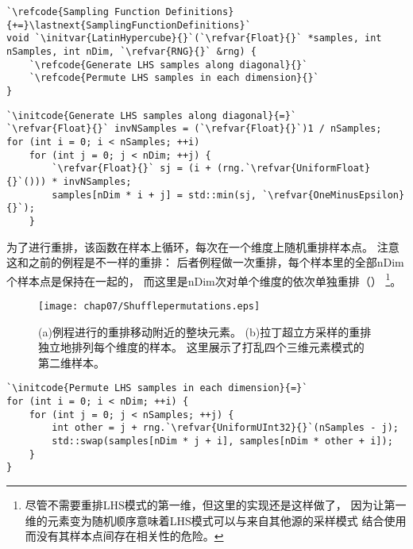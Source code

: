 \begin{lstlisting}
`\refcode{Sampling Function Definitions}{+=}\lastnext{SamplingFunctionDefinitions}`
void `\initvar{LatinHypercube}{}`(`\refvar{Float}{}` *samples, int nSamples, int nDim, `\refvar{RNG}{}` &rng) {
    `\refcode{Generate LHS samples along diagonal}{}`
    `\refcode{Permute LHS samples in each dimension}{}`
}
\end{lstlisting}
\begin{lstlisting}
`\initcode{Generate LHS samples along diagonal}{=}`
`\refvar{Float}{}` invNSamples = (`\refvar{Float}{}`)1 / nSamples;
for (int i = 0; i < nSamples; ++i)
    for (int j = 0; j < nDim; ++j) {
        `\refvar{Float}{}` sj = (i + (rng.`\refvar{UniformFloat}{}`())) * invNSamples;
        samples[nDim * i + j] = std::min(sj, `\refvar{OneMinusEpsilon}{}`);
    }
\end{lstlisting}

为了进行重排，该函数在样本上循环，每次在一个维度上随机重排样本点。
注意这和之前的例程是不一样的重排：
后者例程做一次重排，每个样本里的全部{\ttfamily nDim}个样本点是保持在一起的，
而这里是{\ttfamily nDim}次对单个维度的依次单独重排（）
\footnote{尽管不需要重排LHS模式的第一维，但这里的实现还是这样做了，
    因为让第一维的元素变为随机顺序意味着LHS模式可以与来自其他源的采样模式
    结合使用而没有其样本点间存在相关性的危险。}。
\begin{figure}[htbp]
    \centering\texttt{[image: chap07/Shufflepermutations.eps]}
    \caption{(a)例程进行的重排移动附近的整块元素。
        (b)拉丁超立方采样的重排独立地排列每个维度的样本。
        这里展示了打乱四个三维元素模式的第二维样本。}
    \label{fig:7.22}
\end{figure}

\begin{lstlisting}
`\initcode{Permute LHS samples in each dimension}{=}`
for (int i = 0; i < nDim; ++i) {
    for (int j = 0; j < nSamples; ++j) {
        int other = j + rng.`\refvar{UniformUInt32}{}`(nSamples - j);
        std::swap(samples[nDim * j + i], samples[nDim * other + i]);
    }
}
\end{lstlisting}

